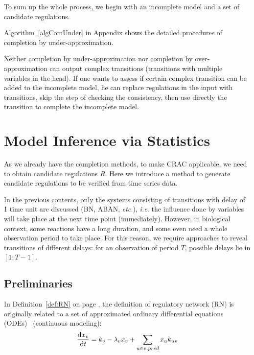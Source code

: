 To sum up the whole process, we begin with an incomplete model and a set of candidate regulations.


Algorithm~\ref{algComUnder} in Appendix shows the detailed procedures of completion by under-approximation.

\begin{remark}
Neither completion by under-approximation nor completion by over-approximation can output complex transitions (transitions with multiple variables in the head).
If one wants to assess if certain complex transition can be added to the incomplete model, he can replace regulations in the input with transitions, skip the step of checking the consistency, then use directly the transition to complete the incomplete model.
\end{remark}

\section{Model Inference via Statistics}
As we already have the completion methods, to make CRAC applicable, we need to obtain candidate regulations $R$.
Here we introduce a method to generate candidate regulations to be verified from time series data.

In the previous contents, only the systems consisting of transitions with delay of 1 time unit are discussed (BN, ABAN, \textit{etc.}), \textit{i.e.} the influence done by variables will take place at the next time point (immediately).
However, in biological context, some reactions have a long duration, and some even need a whole observation period to take place.
For this reason, we require approaches to reveal transitions of different delays: for an observation of period $T$, possible delays lie in $[1;T-1]$.

\subsection{Preliminaries}
In Definition~\ref{def:RN} on page \pageref{def:RN}, the definition of regulatory network (RN) is originally related to a set of approximated ordinary differential equations (ODEs)~\cite{khalis2009smbionet} (continuous modeling):
\begin{equation}\label{eq:differentialEquation}
    \dfrac{{\rm d}x_v}{{\rm d}t}=k_v-\lambda_v x_v +\sum_{u\in v.pred}{x_uk_{uv}}
\end{equation}


